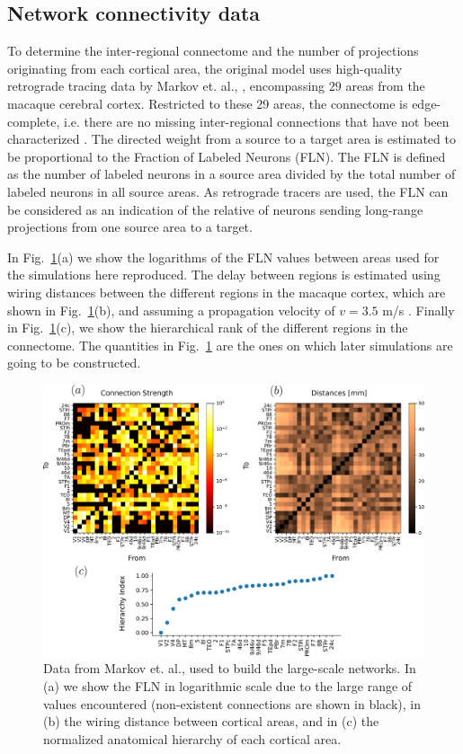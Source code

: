 \subsection{Network connectivity data}\label{netowork}

To determine the inter-regional connectome and the number of projections originating from each cortical area, the original model uses high-quality retrograde tracing data by Markov et. al., \cite{markov2014b}, encompassing $29$ areas from the macaque cerebral cortex. Restricted to these 29 areas, the connectome is edge-complete, i.e. there are no missing inter-regional connections that have not been characterized \cite{Markov2013}. The directed weight from a source to a target area is estimated to be proportional to the Fraction of Labeled Neurons (FLN). The FLN is defined as the number of labeled neurons in a source area divided by the total number of labeled neurons in all source areas. As retrograde tracers are used, the FLN can be considered as an indication of the relative of neurons sending long-range projections from one source area to a target.

In Fig.~\ref{fig:fig_data}(a) we show the logarithms of the FLN values between areas used for the simulations here reproduced. The delay between regions is estimated using wiring distances between the different regions in the macaque cortex, which are shown in Fig.~\ref{fig:fig_data}(b), and assuming a propagation velocity of $v=3.5$ m/s \cite{swadlow1990efferent}. Finally in  Fig.~\ref{fig:fig_data}(c), we show the hierarchical rank of the different regions in the connectome. The quantities in Fig.~\ref{fig:fig_data} are the ones on which later simulations are going to be constructed. 

\begin{figure}[!ht]
 \centering
 \includegraphics[scale=0.5]{figures/fig_markov.pdf}
 \caption{Data from Markov et. al., \cite{markov2014b} used to build the large-scale networks. In (a) we show the FLN in logarithmic scale due to the large range of values encountered (non-existent connections are shown in black), in (b) the wiring distance between cortical areas, and in (c) the normalized anatomical hierarchy of each cortical area.}\label{fig:fig_data}
\end{figure}


